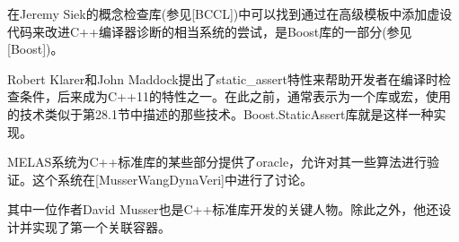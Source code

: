 在Jeremy Siek的概念检查库(参见[BCCL])中可以找到通过在高级模板中添加虚设代码来改进C++编译器诊断的相当系统的尝试，是Boost库的一部分(参见[Boost])。

Robert Klarer和John Maddock提出了static\_assert特性来帮助开发者在编译时检查条件，后来成为C++11的特性之一。在此之前，通常表示为一个库或宏，使用的技术类似于第28.1节中描述的那些技术。Boost.StaticAssert库就是这样一种实现。

MELAS系统为C++标准库的某些部分提供了oracle，允许对其一些算法进行验证。这个系统在[MusserWangDynaVeri]中进行了讨论。

\begin{tcolorbox}[colback=webgreen!5!white,colframe=webgreen!75!black]
\hspace*{0.75cm}其中一位作者David Musser也是C++标准库开发的关键人物。除此之外，他还设计并实现了第一个关联容器。
\end{tcolorbox}
